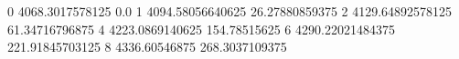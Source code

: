 0 4068.3017578125 0.0
1 4094.58056640625 26.27880859375
2 4129.64892578125 61.34716796875
4 4223.0869140625 154.78515625
6 4290.22021484375 221.91845703125
8 4336.60546875 268.3037109375
